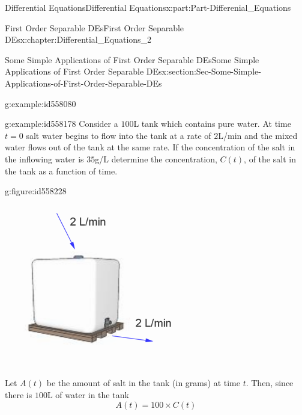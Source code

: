 \documentclass[oneside,10pt,]{book}
\numberwithin{equation}{section}
\begin{document}
\begin{partptx}{Differential Equations}{}{Differential Equations}{}{}{x:part:Part-Differenial_Equations}
\begin{chapterptx}{First Order Separable DEs}{}{First Order Separable DEs}{}{}{x:chapter:Differential_Equations_2}
\begin{sectionptx}{Some Simple Applications of First Order Separable DEs}{}{Some Simple Applications of First Order Separable DEs}{}{}{x:section:Sec-Some-Simple-Applications-of-First-Order-Separable-DEs}
\begin{example}{}{g:example:id558080}
\begin{equation*}
\end{equation*}
%
\end{example}
\begin{example}{}{g:example:id558178}%
Consider a \(100\)L tank which contains pure water. At time \(t=0\) salt water begins to flow into the tank at a rate of \(2\)L\slash{}min and the mixed water flows out of the tank at the same rate. If the concentration of the salt in the inflowing water is \(35\)g\slash{}L determine the concentration, \(C(t)\), of the salt in the tank as a function of time. \begin{figureptx}{}{g:figure:id558228}{}%
\begin{image}{0.2}{0.6}{0.2}%
\includegraphics[width=\linewidth]{./DifferentialEquations/Images/2/1_example9.png}
\end{image}%
\tcblower
\end{figureptx}%
%
\par\smallskip%
\noindent\hypertarget{g:solution:id558239}{}Let \(A(t)\) be the amount of salt in the tank (in grams) at time \(t\). Then, since there is \(100\)L of water in the tank%
\begin{equation}
A(t)=100\times C(t)\label{g:men:id558220}
\end{equation}

\end{example}
\end{sectionptx}
\end{chapterptx}
\end{partptx}
\end{document}
